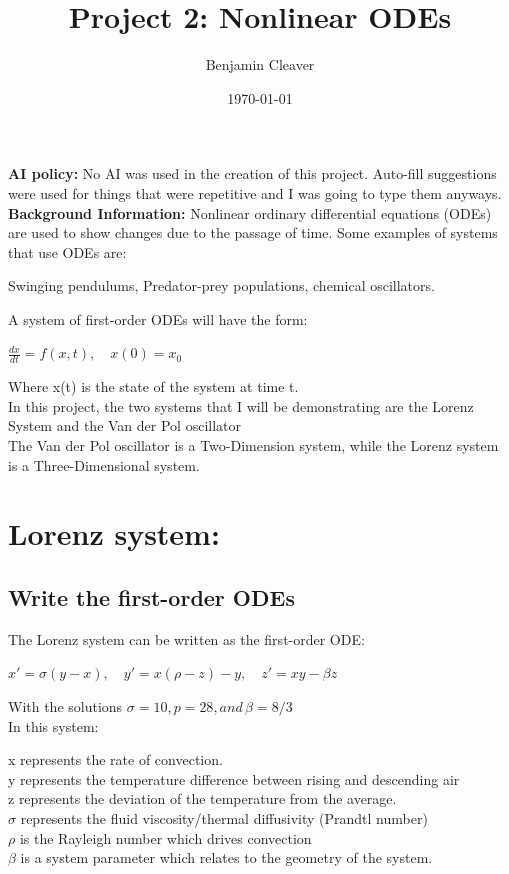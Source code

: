 \documentclass[11pt]{article}
\title{Project 2: Nonlinear ODEs}
\author{Benjamin Cleaver}
\date{\today}
\begin{document}
\maketitle

\textbf{AI policy: }
No AI was used in the creation of this project. Auto-fill suggestions were used for things that were repetitive and I was going to type them anyways. \\


\textbf{Background Information: } Nonlinear ordinary differential equations (ODEs) are used to show changes due to the passage of time.
Some examples of systems that use ODEs are:
\begin{center}
Swinging pendulums, Predator-prey populations, chemical oscillators.
\end{center}

\noindent A system of first-order ODEs will have the form:

\begin{center}
    $\frac{dx}{dt}=f(x,t), \quad x(0)=x_0$
\end{center}
Where x(t) is the state of the system at time t. \\

\noindent In this project, the two systems that I will be demonstrating are the Lorenz System and the Van der Pol oscillator \\

\noindent The Van der Pol oscillator is a Two-Dimension system, while the Lorenz system is a Three-Dimensional system. \\

\section{Lorenz system: } \cite{LorenzSystem}

\subsection{Write the first-order ODEs}
\noindent The Lorenz system can be written as the first-order ODE:

\begin{center}
    $x'= \sigma(y-x), \quad y'=x(\rho-z)-y,\quad z'=xy-\beta z$
\end{center}
\noindent With the solutions $\sigma=10, p=28, and \,\beta=8/3$ \\

\noindent In this system:
\begin{center}
    x represents the rate of convection.\\
    y represents the temperature difference between rising and descending air\\
    z represents the deviation of the temperature from the average.\\
    $\sigma$ represents the fluid viscosity/thermal diffusivity (Prandtl number)\\
    $\rho$ is the Rayleigh number which drives convection\\
    $\beta$ is a system parameter which relates to the geometry of the system.
\end{center}
\end{document}
